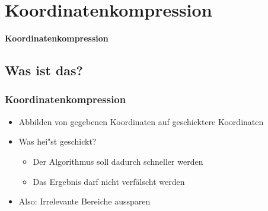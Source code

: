 \section{Koordinatenkompression}
\begin{frame}
	\begin{center}
		\textbf{Koordinatenkompression}
	\end{center}
\end{frame}

\subsection{Was ist das?}
\begin{frame}
	\frametitle{{Koordinatenkompression}}
	\begin{itemize}
		\item Abbilden von gegebenen Koordinaten auf geschicktere Koordinaten
		\pause
		\item Was hei"st geschickt?
		\pause
		\begin{itemize}
			\item Der Algorithmus soll dadurch schneller werden
			\pause
			\item Das Ergebnis darf nicht verfälscht werden
		\end{itemize}
		\pause
		\item Also: Irrelevante Bereiche aussparen
	\end{itemize}
\end{frame}

